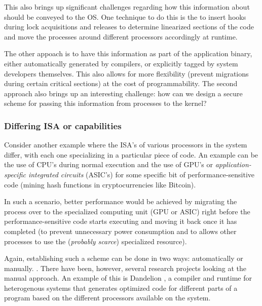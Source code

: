 This also brings up significant challenges regarding how this information about should be conveyed to the OS. One technique to do this is the to insert hooks during lock acquisitions and releases to determine linearized sections of the code and move the processes around different processors accordingly at runtime.

The other appoach is to have this information as part of the application binary, either automatically generated by compilers, or explicitly tagged by system developers themselves. This also allows for more flexibility (\eg prevent migrations during certain critical sections) at the cost of programmability. The second approach also brings up an interesting challenge: how can we design a secure scheme for passing this information from processes to the kernel?


\subsubsection{Differing ISA or capabilities}
Consider another example where the ISA's of various processors in the system differ, with each one specializing in a particular piece of code. An example can be the use of CPU's during normal execution and the use of GPU's or \emph{application-specific integrated circuits} (ASIC's) for some specific bit of performance-sensitive code (\eg mining hash functions in cryptocurrencies like Bitcoin).

In such a scenario, better performance would be achieved by migrating the process over to the specialized computing unit (GPU or ASIC) right before the performance-sensitive code starts executing and moving it back once it has completed (to prevent unnecessary power consumption and to allows other processes to use the (\emph{probably scarce}) specialized resource).

Again, establishing such a scheme can be done in two ways: automatically or manually. . There have been, however, several research projects looking at the manual approach. An example of this is Dandelion \cite{Dandelion}, a compiler and runtime for heterogenous systems that generates optimized code for different parts of a program based on the different processors available on the system.

